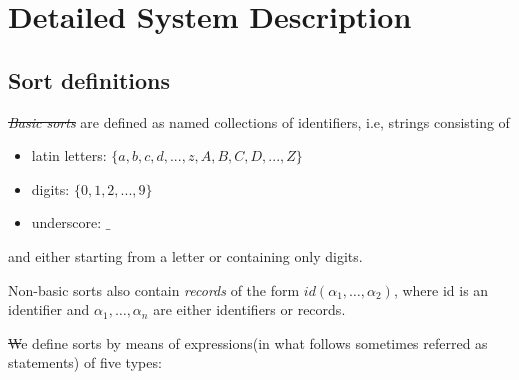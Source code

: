 \documentclass[12pt, letterpaper]{article}
\begin{document}
\section{Detailed System Description}

\subsection{Sort definitions}\label{ss}



\st \textit{Basic sorts} are defined as named collections of identifiers, i.e, strings consisting of
\begin{itemize}
 \item latin letters: $\{a,b,c,d,...,z,A,B,C,D,...,Z\}$
 \item digits: $\{0,1,2,...,9\}$
 \item underscore: $\_$
\end{itemize}
and either starting from a letter or containing only digits.

Non-basic sorts also contain \textit{records} of the form $id(\alpha_1,\dots, \alpha_2)$, where id is an identifier and 
$\alpha_1, \dots, \alpha_n$ are either identifiers or records. 


\st We define sorts by means of expressions(in what follows sometimes referred as statements) of five types:
\end{document}
